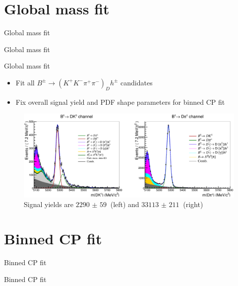\documentclass{beamer}
\begin{document}
\section{Global mass fit}
\begin{frame}{Global mass fit}
  \begin{center}
    {\huge Global mass fit} \\
  \end{center}
\end{frame}

\begin{frame}{Global mass fit}
  \begin{itemize}
    \setlength\itemsep{1.3em}
    \item{Fit all $B^\pm\to(K^+K^-\pi^+\pi^-)_Dh^\pm$ candidates}
    \item{Fix overall signal yield and PDF shape parameters for binned CP fit}
  \end{itemize}
  \begin{figure}
    \centering
    \includegraphics[width = 1.0\textwidth]{../Report/Plots/GlobalFit.png}
    \caption{Signal yields are $\SI{2290(59)}{}$ (left) and $\SI{33113(211)}{}$ (right)}
  \end{figure}
\end{frame}

\section{Binned CP fit}
\begin{frame}{Binned CP fit}
  \begin{center}
    {\huge Binned CP fit} \\
  \end{center}
\end{frame}
\end{document}
